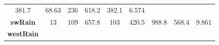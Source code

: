 \documentclass[]{article}
\theoremstyle{definition}
\theoremstyle{definition}
\theoremstyle{definition}
\theoremstyle{remark}
\begin{document}
\begin{longtable}[]{@{}ccccccccc@{}}
\begin{minipage}[t]{0.11\columnwidth}
381.7\strut
\end{minipage} & \begin{minipage}[t]{0.08\columnwidth}\centering\strut
68.63\strut
\end{minipage} & \begin{minipage}[t]{0.08\columnwidth}\centering\strut
236\strut
\end{minipage} & \begin{minipage}[t]{0.07\columnwidth}\centering\strut
618.2\strut
\end{minipage} & \begin{minipage}[t]{0.07\columnwidth}\centering\strut
382.1\strut
\end{minipage} & \begin{minipage}[t]{0.08\columnwidth}\centering\strut
6.574\strut
\end{minipage}\tabularnewline
\begin{minipage}[t]{0.14\columnwidth}\centering\strut
\textbf{swRain}\strut
\end{minipage} & \begin{minipage}[t]{0.06\columnwidth}\centering\strut
13\strut
\end{minipage} & \begin{minipage}[t]{0.05\columnwidth}\centering\strut
109\strut
\end{minipage} & \begin{minipage}[t]{0.11\columnwidth}\centering\strut
657.8\strut
\end{minipage} & \begin{minipage}[t]{0.08\columnwidth}\centering\strut
103\strut
\end{minipage} & \begin{minipage}[t]{0.08\columnwidth}\centering\strut
420.5\strut
\end{minipage} & \begin{minipage}[t]{0.07\columnwidth}\centering\strut
988.8\strut
\end{minipage} & \begin{minipage}[t]{0.07\columnwidth}\centering\strut
568.4\strut
\end{minipage} & \begin{minipage}[t]{0.08\columnwidth}\centering\strut
9.861\strut
\end{minipage}\tabularnewline
\begin{minipage}[t]{0.14\columnwidth}\centering\strut
\textbf{westRain}\strut
\end{minipage} & \begin{minipage}[t]{0.06\columnwidth}\centering\strut

\end{minipage}
\end{longtable}
\end{document}

